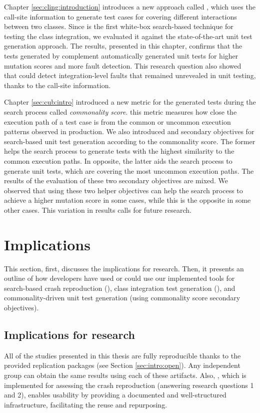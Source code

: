 Chapter \ref{sec:cling:introduction} introduces a new approach called \cling, which uses the call-site information to generate test cases for covering different interactions between two classes. Since \cling is the first white-box search-based technique for testing the class integration, we evaluated it against the state-of-the-art unit test generation approach. The results, presented in this chapter, confirms that the tests generated by \cling complement automatically generated unit tests for higher mutation scores and more fault detection. This research question also showed that \cling could detect integration-level faults that remained unrevealed in unit testing, thanks to the call-site information.


Chapter \ref{sec:cub:intro} introduced a new metric for the generated tests during the search process called \emph{commonality score}. this metric measures how close the execution path of a test case is from the common or uncommon execution patterns observed in production. We also introduced \com and \ucom secondary objectives for search-based unit test generation according to the commonality score. The former helps the search process to generate tests with the highest similarity to the common execution paths. In opposite, the latter aids the search process to generate unit tests, which are covering the most uncommon execution paths. The results of the evaluation of these two secondary objectives are mixed. We observed that using these two helper objectives can help the search process to achieve a higher mutation score in some cases, while this is the opposite in some other cases. This variation in results calls for future research.



\section{Implications}

This section, first, discusses the implications for research. Then, it presents an outline of how developers have used or could use our implemented tools for search-based crash reproduction (\botsing), class integration test generation (\cling), and commonality-driven unit test generation (using commonality score secondary objectives).

\subsection{Implications for research}
All of the studies presented in this thesis are fully reproducible thanks to the provided replication packages (see Section \ref{sec:intro:open}). Any independent group can obtain the same results using each of these artifacts.
Also, \exrunner, which is implemented for assessing the crash reproduction (answering research questions 1 and 2), enables usability by providing a documented and well-structured infrastructure, facilitating the reuse and repurposing.



